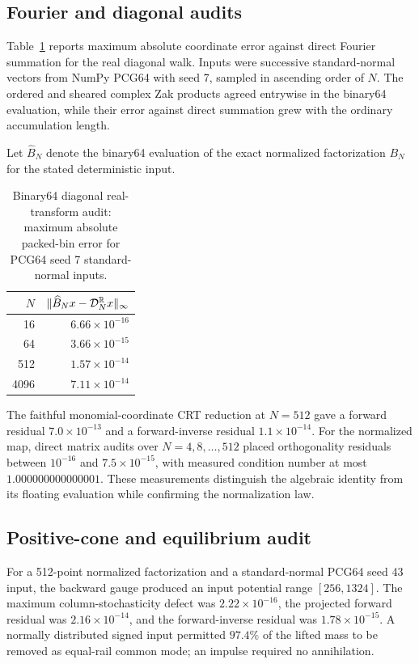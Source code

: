 \subsection{Fourier and diagonal audits}

Table~\ref{tab:dip-audit} reports maximum absolute coordinate error against
direct Fourier summation for the real diagonal walk.  Inputs were successive
standard-normal vectors from NumPy PCG64 with seed 7, sampled in ascending
order of $N$.  The ordered and sheared complex Zak products agreed entrywise in
the binary64 evaluation, while their error against direct summation grew with
the ordinary accumulation length.

Let $\widehat B_N$ denote the binary64 evaluation of the exact normalized
factorization $B_N$ for the stated deterministic input.

\begin{table}[t]
\caption{Binary64 diagonal real-transform audit: maximum absolute packed-bin
error for PCG64 seed 7 standard-normal inputs.}
\label{tab:dip-audit}
\centering
\begin{tabular}{@{}rr@{}}
\toprule
$N$ & $\|\widehat B_Nx-\mathcal{D}_N^{\mathbb{R}}x\|_\infty$\\
\midrule
16   & $6.66\times10^{-16}$\\
64   & $3.66\times10^{-15}$\\
512  & $1.57\times10^{-14}$\\
4096 & $7.11\times10^{-14}$\\
\bottomrule
\end{tabular}
\end{table}

The faithful monomial-coordinate CRT reduction at $N=512$ gave a forward residual
$7.0\times10^{-13}$ and a forward-inverse residual $1.1\times10^{-14}$.
For the normalized map, direct matrix audits over
$N=4,8,\ldots,512$ placed orthogonality residuals between $10^{-16}$ and
$7.5\times10^{-15}$, with measured condition number at most
$1.000000000000001$.  These measurements distinguish the algebraic identity
from its floating evaluation while confirming the normalization law.

\subsection{Positive-cone and equilibrium audit}

For a 512-point normalized factorization and a standard-normal PCG64 seed 43
input, the backward gauge produced an input
potential range $[256,1324]$.  The maximum column-stochasticity defect was
$2.22\times10^{-16}$, the projected forward residual was
$2.16\times10^{-14}$, and the forward-inverse residual was
$1.78\times10^{-15}$.  A normally distributed signed input permitted $97.4\%$
of the lifted mass to be removed as equal-rail common mode; an impulse required
no annihilation.

